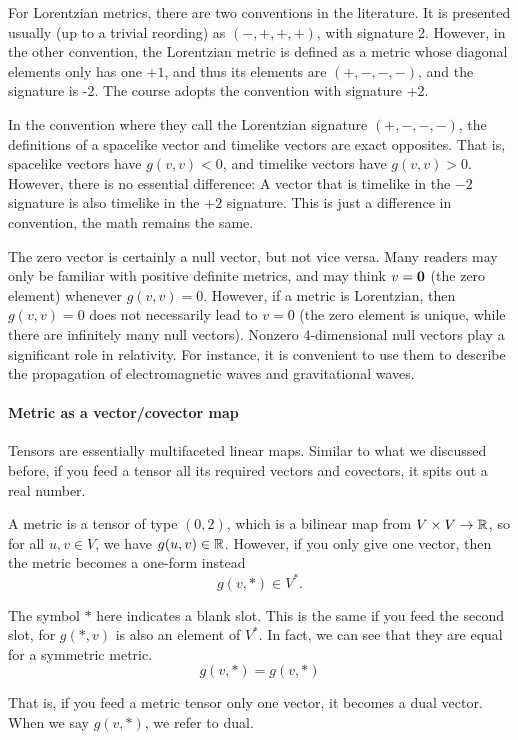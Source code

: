 		For Lorentzian metrics, there are two conventions in the literature.
		It is presented usually (up to a trivial reording) as $(-,+,+,+)$, with signature 2. However,
		in the other convention, the Lorentzian metric is defined as a metric whose diagonal
		elements only has one $+1$, and thus its elements are $(+,-,-,-)$, and the signature is -2.
		The course adopts the convention with signature +2. 

		In the convention where they call the Lorentzian signature $(+,-,-,-)$, the definitions
		of a spacelike vector and timelike vectors are exact opposites. That is, spacelike vectors
		have $g(v,v)<0$, and timelike vectors have $g(v,v)>0$. However, there is no essential
		difference: A vector that is timelike in the $-2$ signature is also timelike in the $+2$ signature.
		This is just a difference in convention, the math remains the same. 

		The zero vector is certainly a null vector, but
		not vice versa. Many readers may only be familiar with positive definite metrics, and
		may think $v = \vb{0}$ (the zero element) whenever $g(v, v) = 0$. However, if a metric is
		Lorentzian, then $g(v, v) = 0$ does not necessarily lead to $v = 0$ (the zero element
		is unique, while there are infinitely many null vectors). Nonzero 4-dimensional null
		vectors play a significant role in relativity. For instance, it is convenient to use them
		to describe the propagation of electromagnetic waves and gravitational waves.

	\paragraph{Metric as a vector/covector map}
		Tensors are essentially multifaceted linear maps. Similar to what we discussed before,
		if you feed a tensor all its required vectors and covectors, it spits out a real number.

		A metric is a tensor of type $(0,2)$, which is a bilinear map from $V\times V\to\mathbb{R}$, so
		for all $u,v\in V$, we have $g(u,v)\in\mathbb{R}$. However, if you only give one vector, then
		the metric becomes a one-form instead
		\[
			g(v,*)\in V^*.
		\]
		
		The symbol $*$ here indicates a blank slot. This is the same if you feed the second slot, for $g(*,v)$ is also an
		element of $V^*$. In fact, we can see that they are equal for a symmetric metric.
		\[
			g(v,*) = g(v,*)
		\]
		
		That is, if you feed a metric tensor only one vector, it becomes a dual vector. When we say
		$g(v,*)$, we refer to dual.

